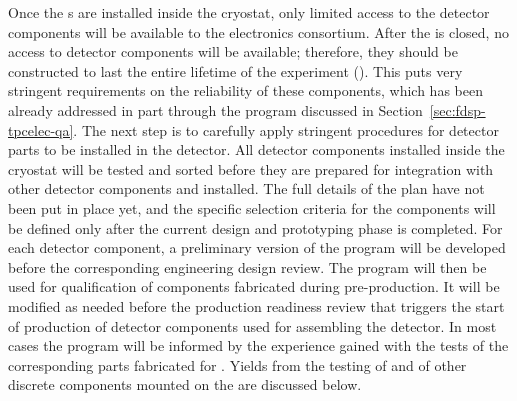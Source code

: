 Once the s are installed inside the cryostat, only
limited access to the detector components will be available to the  electronics
consortium. After the  is closed, no access to detector
components will be available; therefore, they should be constructed to
last the entire lifetime of the experiment (\dunelifetime). This
puts very stringent requirements on the reliability of these
components, which has been already addressed in part through 
the  program discussed in Section~\ref{sec:fdsp-tpcelec-qa}. The
next step is to carefully apply stringent  procedures for  
detector parts to be installed in the detector.
All detector components installed inside the cryostat will
be tested and sorted before they are prepared for integration
with other detector components and installed. The full
details of the  plan have not been put in place
yet, and the specific selection criteria for the components will
be defined only after the current design and
prototyping phase is completed. For each detector component, a preliminary
version of the  program will be developed before the corresponding 
engineering design review. The program will then be used for
qualification of components fabricated during 
pre-production. It will be modified as needed before the production
readiness review that triggers the start of production of detector components
used for assembling the detector. In most cases the  program
will be informed by the experience gained with the tests of the corresponding
parts fabricated for . Yields from the testing of 
and of other discrete components mounted on the  are discussed 
below. 

